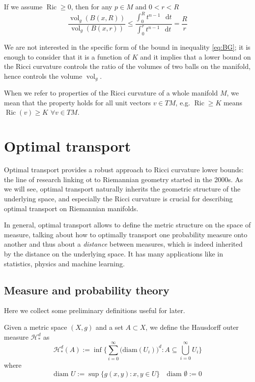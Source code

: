 \documentclass[a4paper,12pt,reqno]{amsbook}
\theoremstyle{definition} %
\newcommand*\de{\mathop{}\!\mathrm{d}}
\newcommand{\1}{\mathbbm{1}}
\newcommand{\mH}{\mathscr{H}}
\DeclareMathOperator{\Ric}{Ric}
\DeclareMathOperator{\vol}{vol}
\def\vol{\mathop{\mathrm{vol}}\nolimits}
\def\Ric{\mathop{\mathrm{Ric}}\nolimits}
\theoremstyle{plain}
\theoremstyle{remark}
\begin{document}
\begin{theorem}[Bishop-Gromov volume comparison for $K=0$]
   If we assume $\Ric\ge 0$, then for any $p \in M$ and $0<r<R$ 
\begin{equation}\label{eq:BG}
\frac{\vol_g(B(x,R))}{\vol_g(B(x,r))} \le
 \frac{\int_0^R t^{n-1}\,\de{t}}{\int_0^r t^{n-1}\,\de{t}} = \frac{R}{r}
\end{equation}
\end{theorem}

We are not interested in the specific form of the bound in inequality \ref{eq:BG}; it is enough to consider that it is a function of $K$ and it implies that a lower bound on the Ricci curvature controls the ratio of the volumes of two balls on the manifold, hence controls the volume $\vol_g$. 

When we refer to properties of the Ricci curvature of a whole manifold $M$, we mean that the property holds for all unit vectors $v \in TM$, e.g. $\Ric \ge K$ means $\Ric(v) \ge K \,\, \forall v\in TM$.

\newpage
\chapter{Optimal transport}

Optimal transport provides a robust approach to Ricci curvature lower bounds: the line of research linking ot to Riemannian geometry started in the 2000s. As we will see, optimal transport naturally inherits the geometric structure of the underlying space, and especially the Ricci curvature is crucial for describing optimal transport on Riemannian manifolds.

In general, optimal transport allows to define the metric structure on the space of measure, talking about how to optimally transport one probability measure onto another and thus about a \textit{distance} between measures, which is indeed inherited by the distance on the underlying space. It has many applications like in statistics, physics and machine learning.  \cite{brue} \cite{villani2008optimal} \cite{Ohta_2014}

\section{Measure and probability theory 
}
Here we collect some preliminary definitions useful for later. 

\begin{definition}
    Given a metric space $(X,g)$ and a set $A \subset X$, we define the Hausdorff outer measure $\mH^d_*$ as
    \[\mH^d_*(A) := \inf\Big\{\sum_{i=0}^\infty \big(\text{diam}(U_i)\big)^d : A \subseteq\bigcup_{i=0}^\infty U_i \Big\}
\]
where
    \[
    \text{diam } U := \sup\{g(x,y) : x,y \in U\} \quad \text{diam } \emptyset := 0
    \]
\end{definition}
\end{document}
